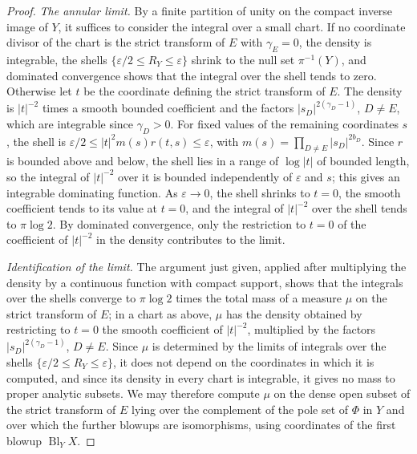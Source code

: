 \begin{proof}
\emph{The annular limit.} By a finite partition of unity on the compact inverse image of $Y$, it suffices to consider the integral over a small chart. If no coordinate divisor of the chart is the strict transform of $E$ with $\gamma_E=0$, the density is integrable, the shells $\{\varepsilon/2\leq R_Y\leq\varepsilon\}$ shrink to the null set $\pi^{-1}(Y)$, and dominated convergence shows that the integral over the shell tends to zero. Otherwise let $t$ be the coordinate defining the strict transform of $E$. The density is $|t|^{-2}$ times a smooth bounded coefficient and the factors $|s_D|^{2(\gamma_D-1)}$, $D\ne E$, which are integrable since $\gamma_D>0$. For fixed values of the remaining coordinates $s$, the shell is $\varepsilon/2\leq|t|^2m(s)r(t,s)\leq\varepsilon$, with $m(s)=\prod_{D\ne E}|s_D|^{2b_D}$. Since $r$ is bounded above and below, the shell lies in a range of $\log|t|$ of bounded length, so the integral of $|t|^{-2}$ over it is bounded independently of $\varepsilon$ and $s$; this gives an integrable dominating function. As $\varepsilon\to0$, the shell shrinks to $t=0$, the smooth coefficient tends to its value at $t=0$, and the integral of $|t|^{-2}$ over the shell tends to $\pi\log2$. By dominated convergence, only the restriction to $t=0$ of the coefficient of $|t|^{-2}$ in the density contributes to the limit.

\emph{Identification of the limit.} The argument just given, applied after multiplying the density by a continuous function with compact support, shows that the integrals over the shells converge to $\pi\log2$ times the total mass of a measure $\mu$ on the strict transform of $E$; in a chart as above, $\mu$ has the density obtained by restricting to $t=0$ the smooth coefficient of $|t|^{-2}$, multiplied by the factors $|s_D|^{2(\gamma_D-1)}$, $D\ne E$. Since $\mu$ is determined by the limits of integrals over the shells $\{\varepsilon/2\leq R_Y\leq\varepsilon\}$, it does not depend on the coordinates in which it is computed, and since its density in every chart is integrable, it gives no mass to proper analytic subsets. We may therefore compute $\mu$ on the dense open subset of the strict transform of $E$ lying over the complement of the pole set of $\Phi$ in $Y$ and over which the further blowups are isomorphisms, using coordinates of the first blowup $\operatorname{Bl}_YX$.


\end{proof}
